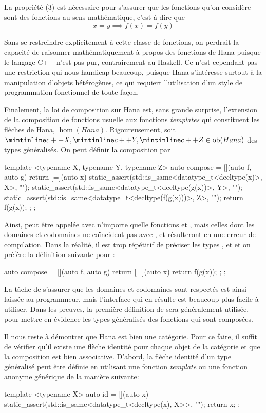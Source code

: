 La propriété (3) est nécessaire pour s'assurer que les fonctions qu'on
considère sont des fonctions au sens mathématique, c'est-à-dire que
\[
    x = y \implies f(x) = f(y)
\]

Sans se restreindre explicitement à cette classe de fonctions, on perdrait la
capacité de raisonner mathématiquement à propos des fonctions de Hana puisque
le langage C++ n'est pas pur, contrairement au Haskell. Ce n'est cependant pas
une restriction qui nous handicap beaucoup, puisque Hana s'intéresse surtout à
la manipulation d'objets hétérogènes, ce qui requiert l'utilisation d'un style
de programmation fonctionnel de toute façon.

Finalement, la loi de composition sur Hana est, sans grande surprise,
l'extension de la composition de fonctions usuelle aux fonctions
\textit{templates} qui constituent les flèches de Hana, $\hom(Hana)$.
Rigoureusement, soit $\icpp{X}, \icpp{Y}, \icpp{Z} \in \ob(Hana)$ des
types généralisés. On peut définir la composition par
\begin{cpp}
    template <typename X, typename Y, typename Z>
    auto compose = [](auto f, auto g) {
        return [=](auto x) {
            static_assert(std::is_same<datatype_t<decltype(x)>, X>{}, "");
            static_assert(std::is_same<datatype_t<decltype(g(x))>, Y>{}, "");
            static_assert(std::is_same<datatype_t<decltype(f(g(x)))>, Z>{}, "");
            return f(g(x));
        };
    };
\end{cpp}

Ainsi,  peut être appelée avec n'importe quelle fonctions
 et , mais celles dont les domaines et codomaines ne coïncident
pas avec ,  et  résulteront en une erreur de compilation.
Dans la réalité, il est trop répétitif de préciser les types ,  et
 et on préfère la définition suivante pour :
\begin{cpp}
    auto compose = [](auto f, auto g) {
        return [=](auto x) {
            return f(g(x));
        };
    };
\end{cpp}

La tâche de s'assurer que les domaines et codomaines sont respectés est ainsi
laissée au programmeur, mais l'interface qui en résulte est beaucoup plus
facile à utiliser. Dans les preuves, la première définition de 
sera généralement utilisée, pour mettre en évidence les types généralisés des
fonctions qui sont composées.

Il nous reste à démontrer que Hana est bien une catégorie. Pour ce faire,
il suffit de vérifier qu'il existe une flèche identité pour chaque objet de
la catégorie et que la composition est bien associative. D'abord, la flèche
identité d'un type généralisé peut être définie en utilisant une fonction
\textit{template} ou une fonction anonyme générique de la manière suivante:
\begin{cpp}
    template <typename X>
    auto id = [](auto x) {
        static_assert(std::is_same<datatype_t<decltype(x), X>>{}, "");
        return x;
    };
\end{cpp}

